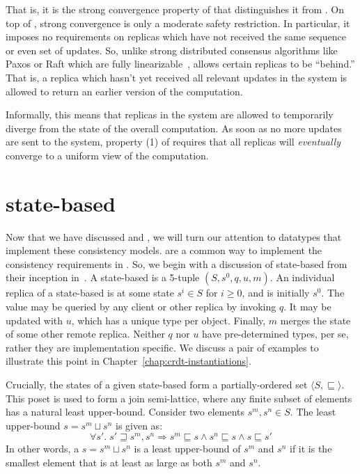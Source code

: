 That is, it is the strong convergence property of \SEC that distinguishes it
from \EC. On top of \EC, strong convergence is only a moderate safety
restriction. In particular, it imposes no requirements on replicas which have
not received the same sequence or even set of updates. So, unlike strong
distributed consensus algorithms like Paxos or Raft which are fully
linearizable~\citep{lamport98,ongaro14}, \SEC allows certain replicas to be
``behind.'' That is, a replica which hasn't yet received all relevant updates in
the system is allowed to return an earlier version of the computation.

Informally, this means that replicas in the system are allowed to temporarily
diverge from the state of the overall computation. As soon as no more updates
are sent to the system, property (1) of \EC requires that all replicas will
\emph{eventually} converge to a uniform view of the computation.

\section{state-based \CRDTs}
\label{sec:state-based-crdts}

Now that we have discussed \EC and \SEC, we will turn our attention to datatypes
that implement these consistency models. \CRDTs are a common way to implement
the consistency requirements in \SEC. So, we begin with a discussion of
state-based \CRDTs from their inception in~\citet{shapiro11}. A state-based
\CRDT is a 5-tuple $(S, s^0, q, u, m)$. An individual replica of a state-based
\CRDT is at some state $s^i \in S$ for $i \ge 0$, and is initially $s^0$. The
value may be queried by any client or other replica by invoking $q$. It may be
updated with $u$, which has a unique type per \CRDT object. Finally, $m$ merges
the state of some other remote replica.  Neither $q$ nor $u$ have pre-determined
types, per se, rather they are implementation specific. We discuss a pair of
examples to illustrate this point in Chapter~\ref{chap:crdt-instantiations}.

Crucially, the states of a given state-based \CRDT form a partially-ordered set
$\langle S, \sqsubseteq \rangle$. This poset is used to form a join
semi-lattice, where any finite subset of elements has a natural least
upper-bound. Consider two elements $s^m, s^n \in S$. The least upper-bound
$s = s^m \sqcup s^n$ is given as:
\[
  \forall s'.\; s' \sqsupseteq s^m, s^n \Rightarrow
    s^m \sqsubseteq s \land
    s^n \sqsubseteq s \land
    s \sqsubseteq s'
\]
In other words, a $s = s^m \sqcup s^n$ is a least upper-bound of $s^m$ and $s^n$
if it is the smallest element that is at least as large as both $s^m$ and $s^n$.

